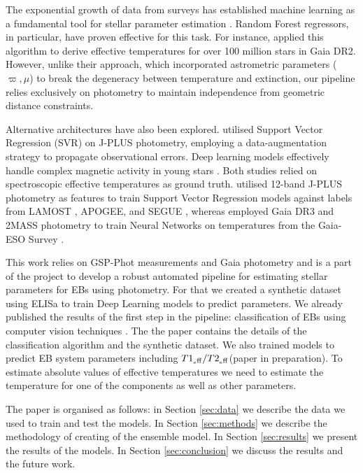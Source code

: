 \documentclass[preprint,12pt,authoryear]{elsarticle}
\begin{document}
The exponential growth of data from surveys has established machine learning as a fundamental tool for stellar parameter estimation \citep{Li2025}. Random Forest regressors, in particular, have proven effective for this task. For instance, \citet{Bai2019} applied this algorithm to derive effective temperatures for over 100 million stars in Gaia DR2. However, unlike their approach, which incorporated astrometric parameters ($\varpi, \mu$) to break the degeneracy between temperature and extinction, our pipeline relies exclusively on photometry to maintain independence from geometric distance constraints. 

Alternative architectures have also been explored. \citet{Wang2022} utilised Support Vector Regression (SVR) on J-PLUS photometry, employing a data-augmentation strategy to propagate observational errors. Deep learning models effectively handle complex magnetic activity in young stars \citep{Tarantino2025}. Both studies relied on spectroscopic effective temperatures as ground truth. \citet{Wang2022} utilised 12-band J-PLUS photometry as features \citep{Cenarro2019} to train Support Vector Regression models against labels from LAMOST \citep{Luo2015}, APOGEE, and SEGUE \citep{Yanny2009}, whereas \citet{Tarantino2025} employed Gaia DR3 \citep{GaiaDR3_main} and 2MASS photometry \citep{Skrutskie2006} to train Neural Networks on temperatures from the Gaia-ESO Survey \citep{Gilmore2012, Randich2013}.

This work relies on GSP-Phot measurements and Gaia photometry and is a part of the project to develop a robust automated pipeline for estimating stellar parameters for EBs using photometry. 
For that we created a synthetic dataset using ELISa to train Deep Learning models to predict parameters. 
We already published the results of the first step in the pipeline: classification of EBs using computer vision techniques \citep{Parimucha2025}.
The the paper contains the details of the classification algorithm and the synthetic dataset. 
We also trained models to predict EB system parameters including $T1_{\rm_eff}/T2_{\rm_eff}$(paper in preparation). 
To estimate absolute values of effective temperatures we need to estimate the temperature for one of the components as well as other parameters.

The paper is organised as follows: in Section \ref{sec:data} we describe the data we used to train and test the models.
In Section \ref{sec:methods} we describe the methodology of creating of the ensemble model.
In Section \ref{sec:results} we present the results of the models.
In Section \ref{sec:conclusion} we discuss the results and the future work.
\end{document}
